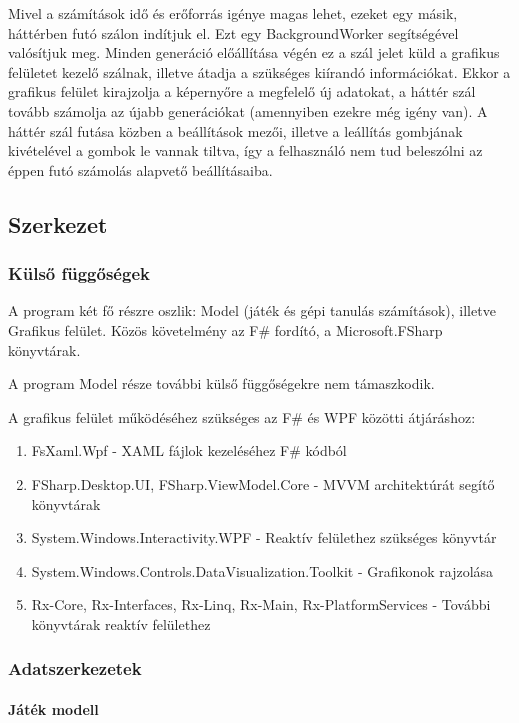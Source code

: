 \documentclass[12pt]{article}
\begin{document}
Mivel a számítások idő és erőforrás igénye magas lehet, ezeket egy másik, háttérben futó szálon indítjuk el. Ezt egy BackgroundWorker segítségével valósítjuk meg. Minden generáció előállítása végén ez a szál jelet küld a grafikus felületet kezelő szálnak, illetve átadja a szükséges kiírandó információkat. Ekkor a grafikus felület kirajzolja a képernyőre a megfelelő új adatokat, a háttér szál tovább számolja az újabb generációkat (amennyiben ezekre még igény van). A háttér szál futása közben a beállítások mezői, illetve a leállítás gombjának kivételével a gombok le vannak tiltva, így a felhasználó nem tud beleszólni az éppen futó számolás alapvető beállításaiba.

\subsection{Szerkezet}

\subsubsection{Külső függőségek}

A program két fő részre oszlik: Model (játék és gépi tanulás számítások), illetve Grafikus felület.
Közös követelmény az F\# fordító, a Microsoft.FSharp könyvtárak.

A program Model része további külső függőségekre nem támaszkodik.

A grafikus felület működéséhez szükséges az F\# és WPF közötti átjáráshoz:

\begin{enumerate}
	\item FsXaml.Wpf - XAML fájlok kezeléséhez F\# kódból
	\item FSharp.Desktop.UI, FSharp.ViewModel.Core - MVVM architektúrát segítő könyvtárak
	\item System.Windows.Interactivity.WPF - Reaktív felülethez szükséges könyvtár
	\item System.Windows.Controls.DataVisualization.Toolkit - Grafikonok rajzolása
	\item Rx-Core, Rx-Interfaces, Rx-Linq, Rx-Main, Rx-PlatformServices - További könyvtárak reaktív felülethez
\end{enumerate}

\subsubsection{Adatszerkezetek}

\paragraph{Játék modell}
\end{document}
